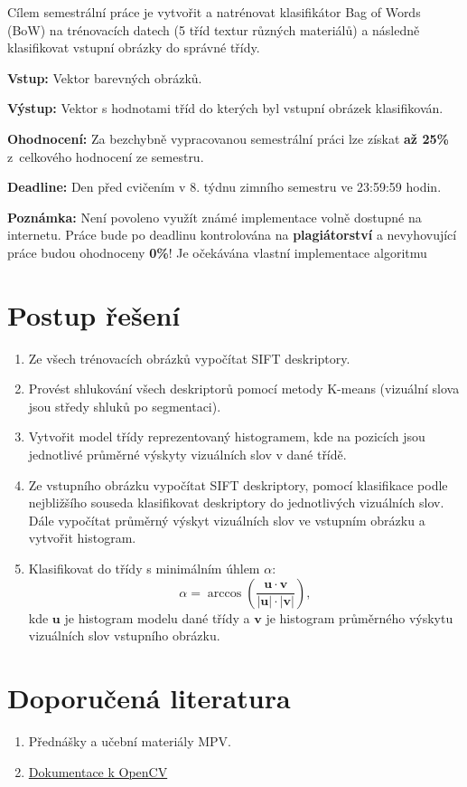 \documentclass[12pt, a4paper]{article}
\begin{document}
\par{Cílem semestrální práce je vytvořit a natrénovat klasifikátor Bag of Words (BoW) na trénovacích datech (5 tříd textur různých materiálů) a následně klasifikovat vstupní obrázky do správné třídy.}

\par{\textbf{Vstup:} Vektor barevných obrázků.}

\par{\textbf{Výstup:} Vektor s hodnotami tříd do kterých byl vstupní obrázek klasifikován.}

\par{\textbf{Ohodnocení:} Za bezchybně vypracovanou semestrální práci lze získat \textbf{až 25\%} z~celkového hodnocení ze semestru.}

\par{\textbf{Deadline:} Den před cvičením v 8. týdnu zimního semestru ve 23:59:59 hodin.}

\par{\textbf{Poznámka:} Není povoleno využít známé implementace volně dostupné na internetu. Práce bude po deadlinu kontrolována na \textbf{plagiátorství} a nevyhovující práce budou ohodnoceny \textbf{0\%}! Je očekávána vlastní implementace algoritmu}

\section*{Postup řešení}
\begin{enumerate}
	\item Ze všech trénovacích obrázků vypočítat SIFT deskriptory.
	\item Provést shlukování všech deskriptorů pomocí metody K-means (vizuální slova jsou středy shluků po segmentaci).
	\item Vytvořit model třídy reprezentovaný histogramem, kde na pozicích jsou jednotlivé průměrné výskyty vizuálních slov v dané třídě.
	\item Ze vstupního obrázku vypočítat SIFT deskriptory, pomocí klasifikace podle nejbližšího souseda klasifikovat deskriptory do jednotlivých vizuálních slov. Dále vypočítat průměrný výskyt vizuálních slov ve vstupním obrázku a vytvořit histogram. 
	\item Klasifikovat do třídy s minimálním úhlem $\alpha$:
		\begin{equation}
			\alpha = \arccos \left( \frac{\bm{u} \cdot \bm{v}}{|\bm{u}| \cdot |\bm{v}|} \right),
		\end{equation}
		kde $\bm{u}$ je histogram modelu dané třídy a $\bm{v}$ je histogram průměrného výskytu vizuálních slov vstupního obrázku.
\end{enumerate}

\section*{Doporučená literatura}
\begin{enumerate}
	\item Přednášky a učební materiály MPV.
	\item \href{http://docs.opencv.org/}{Dokumentace k OpenCV}
\end{enumerate}
\end{document}
